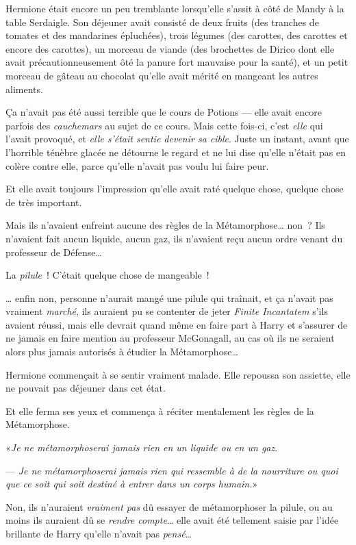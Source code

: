 \later

Hermione était encore un peu tremblante lorsqu'elle s'assit à côté de Mandy à la table Serdaigle. Son déjeuner avait consisté de deux fruits (des tranches de tomates et des mandarines épluchées), trois légumes (des carottes, des carottes et encore des carottes), un morceau de viande (des brochettes de Dirico dont elle avait précautionneusement ôté la panure fort mauvaise pour la santé), et un petit morceau de gâteau au chocolat qu'elle avait mérité en mangeant les autres aliments.

Ça n'avait pas été aussi terrible que le cours de Potions --- elle avait encore parfois des \emph{cauchemars} au sujet de ce cours. Mais cette fois-ci, c'est \emph{elle} qui l'avait provoqué, et \emph{elle s'était sentie devenir sa cible}. Juste un instant, avant que l'horrible ténèbre glacée ne détourne le regard et ne lui dise qu'elle n'était pas en colère contre elle, parce qu'elle n'avait pas voulu lui faire peur.

Et elle avait toujours l'impression qu'elle avait raté quelque chose, quelque chose de très important.

Mais ils n'avaient enfreint aucune des règles de la Métamorphose… non~? Ils n'avaient fait aucun liquide, aucun gaz, ils n'avaient reçu aucun ordre venant du professeur de Défense…

La \emph{pilule}~! C'était quelque chose de mangeable~!

… enfin non, personne n'aurait mangé une pilule qui traînait, et ça n'avait pas vraiment \emph{marché}, ils auraient pu se contenter de jeter \emph{Finite Incantatem} s'ils avaient réussi, mais elle devrait quand même en faire part à Harry et s'assurer de ne jamais en faire mention au professeur McGonagall, au cas où ils ne seraient alors plus jamais autorisés à étudier la Métamorphose…

Hermione commençait à se sentir vraiment malade. Elle repoussa son assiette, elle ne pouvait pas déjeuner dans cet état.

Et elle ferma ses yeux et commença à réciter mentalement les règles de la Métamorphose.

«\emph{Je ne métamorphoserai jamais rien en un liquide ou en un gaz}.

--- \emph{Je ne métamorphoserai jamais rien qui ressemble à de la nourriture ou quoi que ce soit qui soit destiné à entrer dans un corps humain.}»

Non, ils n'auraient \emph{vraiment pas} dû essayer de métamorphoser la pilule, ou au moins ils auraient dû se \emph{rendre compte}… elle avait été tellement saisie par l'idée brillante de Harry qu'elle n'avait pas \emph{pensé}…


